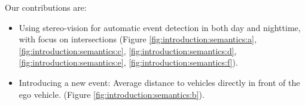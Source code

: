 Our contributions are:
\begin{itemize}
\item Using stereo-vision for automatic event detection in both day and nighttime, with focus on intersections (Figure \ref{fig:introduction:semantics:a}, \ref{fig:introduction:semantics:c}, \ref{fig:introduction:semantics:d}, \ref{fig:introduction:semantics:e}, \ref{fig:introduction:semantics:f}).
\item Introducing a new event: Average distance to vehicles directly in front of the ego vehicle. (Figure \ref{fig:introduction:semantics:b}).
\end{itemize}

